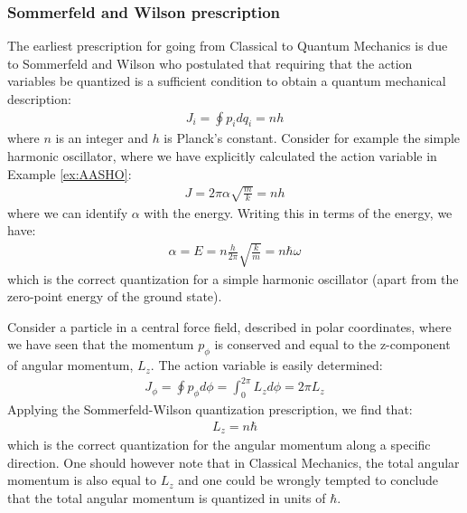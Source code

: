 \subsubsection{Sommerfeld and Wilson prescription}
The earliest prescription for going from Classical to Quantum Mechanics is due to Sommerfeld and Wilson who postulated that requiring that the action variables be quantized is a sufficient condition to obtain a quantum mechanical description:
\begin{align}
J_i=\oint p_i dq_i=nh
\end{align}
where $n$ is an integer and $h$ is Planck's constant. Consider for example the simple harmonic oscillator, where we have explicitly calculated the action variable in Example \ref{ex:AASHO}:
\begin{align}
J=2\pi\alpha\sqrt{\frac{m}{k}}=nh
\end{align}
where we can identify $\alpha$ with the energy. Writing this in terms of the energy, we have:
\begin{align}
\alpha=E=n \frac{h}{2\pi}\sqrt{\frac{k}{m}}=n\hbar\omega
\end{align}
which is the correct quantization for a simple harmonic oscillator (apart from the zero-point energy of the ground state). 

Consider a particle in a central force field, described in polar coordinates, where we have seen that the momentum $p_\phi$ is conserved and equal to the z-component of angular momentum, $L_z$. The action variable is easily determined:
\begin{align}
J_\phi=\oint p_\phi d\phi=\int_0^{2\pi}L_zd\phi=2\pi L_z
\end{align}
Applying the Sommerfeld-Wilson quantization prescription, we find that:
\begin{align}
L_z=n\hbar
\end{align}
which is the correct quantization for the angular momentum along a specific direction. One should however note that in Classical Mechanics, the total angular momentum is also equal to $L_z$ and one could be wrongly tempted to conclude that the total angular momentum is quantized in units of $\hbar$.

